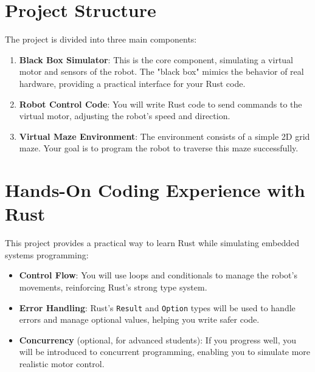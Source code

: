 \documentclass{article}
\begin{document}
	\section*{Project Structure}
	The project is divided into three main components:
	\begin{enumerate}
		\item \textbf{Black Box Simulator}: 
		This is the core component, simulating a virtual motor and sensors of the robot. The "black box" mimics the behavior of real hardware, providing a practical interface for your Rust code.
		\item \textbf{Robot Control Code}:
		You will write Rust code to send commands to the virtual motor, adjusting the robot's speed and direction.
		\item \textbf{Virtual Maze Environment}:
		The environment consists of a simple 2D grid maze. Your goal is to program the robot to traverse this maze successfully.
	\end{enumerate}
	
	\section*{Hands-On Coding Experience with Rust}
	This project provides a practical way to learn Rust while simulating embedded systems programming:
	\begin{itemize}
		\item \textbf{Control Flow}:
		You will use loops and conditionals to manage the robot's movements, reinforcing Rust’s strong type system.
		\item \textbf{Error Handling}:
		Rust's \texttt{Result} and \texttt{Option} types will be used to handle errors and manage optional values, helping you write safer code.
		\item \textbf{Concurrency} (optional, for advanced students):
		If you progress well, you will be introduced to concurrent programming, enabling you to simulate more realistic motor control.
	\end{itemize}
	
\end{document}
